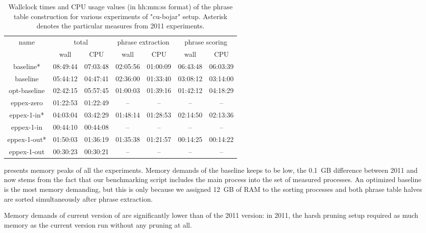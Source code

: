 \begin{table}[ht]
\centering
\begin{tabular}{ | c | c c | c c | c c | }
\hline
name & \multicolumn{2}{|c|}{total} & \multicolumn{2}{|c|}{phrase extraction} & \multicolumn{2}{|c|}{phrase scoring} \\
 & wall & CPU & wall & CPU & wall & CPU \\
\hline
\hline
baseline*    & 08:49:44 & 07:03:48 & 02:05:56 & 01:00:09 & 06:43:48 & 06:03:39 \\
baseline     & 05:44:12 & 04:47:41 & 02:36:00 & 01:33:40 & 03:08:12 & 03:14:00 \\
opt-baseline & 02:42:15 & 05:57:45 & 01:00:03 & 01:39:16 & 01:42:12 & 04:18:29 \\
eppex-zero   & 01:22:53 & 01:22:49 & -- & -- & -- & -- \\
\hline
eppex-1-in*  & 04:03:04 & 03:42:29 & 01:48:14 & 01:28:53 & 02:14:50 & 02:13:36 \\
eppex-1-in   & 00:44:10 & 00:44:08 & -- & -- & -- & -- \\
\hline
eppex-1-out* & 01:50:03 & 01:36:19 & 01:35:38 & 01:21:57 & 00:14:25 & 00:14:22 \\
eppex-1-out  & 00:30:23 & 00:30:21 & -- & -- & -- & -- \\
\hline
\end{tabular}
\caption{\label{cu-bojar-time-benchmarks}Wallclock times and CPU usage values
(in hh:mm:ss format) of the phrase table construction for various experiments
of "cu-bojar" setup. Asterisk denotes the particular measures from 2011
experiments.}
\end{table}

 presents memory peaks of all the
experiments.
Memory demands of the baseline keeps to be low, the 0.1~GB difference between 2011
and now stems from the fact that our benchmarking script includes the main process
into the set of measured processes.
An optimized baseline is the most memory demanding, but this is only because we
assigned 12~GB of RAM to the sorting processes and both phrase table halves are sorted
simultaneously after phrase extraction.

Memory demands of current version of \eppex{} are significantly lower than of the 2011
version: in 2011, the harsh pruning setup required as much memory as the current version
run without any pruning at all.

